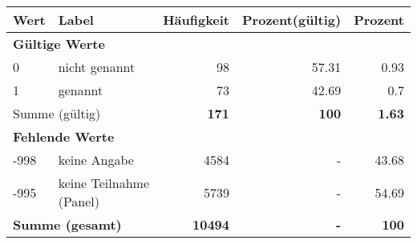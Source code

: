      \begin{longtable}{lXrrr}
     \toprule
     \textbf{Wert} & \textbf{Label} & \textbf{Häufigkeit} & \textbf{Prozent(gültig)} & \textbf{Prozent} \\
     \endhead
     \midrule
     \multicolumn{5}{l}{\textbf{Gültige Werte}}\\

     0 &
     \multicolumn{1}{X}{ nicht genannt   } &


       \num{98} &
       \num[round-mode=places,round-precision=2]{57,31} &
         \num[round-mode=places,round-precision=2]{0,93} \\

     1 &
     \multicolumn{1}{X}{ genannt   } &


       \num{73} &
       \num[round-mode=places,round-precision=2]{42,69} &
         \num[round-mode=places,round-precision=2]{0,7} \\
     \midrule
     \multicolumn{2}{l}{Summe (gültig)} &
       \textbf{\num{171}} &
     \textbf{100} &
       \textbf{\num[round-mode=places,round-precision=2]{1,63}} \\
     \multicolumn{5}{l}{\textbf{Fehlende Werte}}\\
       -998 &
       keine Angabe &
         \num{4584} &
        - &
         \num[round-mode=places,round-precision=2]{43,68} \\
       -995 &
       keine Teilnahme (Panel) &
         \num{5739} &
        - &
         \num[round-mode=places,round-precision=2]{54,69} \\
     \midrule
     \multicolumn{2}{l}{\textbf{Summe (gesamt)}} &
          \textbf{\num{10494}} &
        \textbf{-} &
        \textbf{100} \\
     \bottomrule
     \end{longtable}
     
